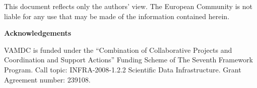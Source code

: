 {\noindent 

\noindent This document reflects only the authors' view. The European Community is not liable for any use that may be made of the information contained herein.

\textbf{}

\noindent \textbf{Acknowledgements}

\noindent VAMDC is funded under the ``Combination of Collaborative Projects and Coordination and  Support Actions'' Funding Scheme of The Seventh Framework Program. Call topic: INFRA-2008-1.2.2 Scientific Data Infrastructure. Grant Agreement number: 239108.

\textbf{}

}